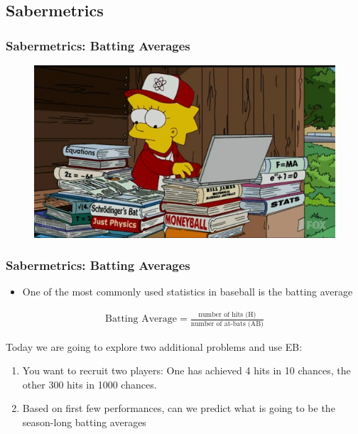 \documentclass[
  shownotes,
  xcolor={svgnames},
  hyperref={colorlinks,citecolor=DarkBlue,linkcolor=DarkRed,urlcolor=DarkBlue}
  ]{beamer}
\begin{document}
\subsection{Sabermetrics}
\begin{frame}[fragile]
\frametitle{Sabermetrics: Batting Averages}

\begin{figure}[H] \centering
  \centering
  \includegraphics[scale=0.45]{figures/simpsons-sabermetrics.jpg}
  \\
  \tiny 
\end{figure}
\end{frame}

\begin{frame}[fragile]
\frametitle{Sabermetrics: Batting Averages}
\begin{itemize}
\item One of the most commonly used statistics in baseball is the batting average
\end{itemize}

\begin{align}
\text{Batting Average} = \frac{\text{number of hits (H)}}{\text{number of at-bats (AB)}}
\end{align}

\bigskip
Today we are going to explore two additional problems  and use EB:
\medskip
\begin{enumerate}
\item You want to recruit two players:  One has achieved 4 hits in 10 chances, the other 300 hits in 1000 chances.
\item Based on first few performances, can we predict what is going to be the season-long batting averages
\end{enumerate}

\end{frame}
\end{document}

